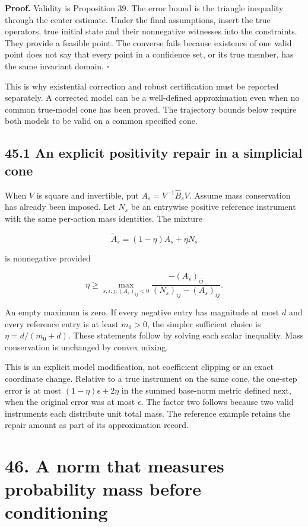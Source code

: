 \documentclass[11pt,letterpaper]{article}
\begin{document}
\textbf{Proof.} Validity is Proposition 39. The error bound is the
triangle inequality through the center estimate. Under the final
assumptions, insert the true operators, true initial state and their
nonnegative witnesses into the constraints. They provide a feasible
point. The converse fails because existence of one valid point does not
say that every point in a confidence set, or its true member, has the
same invariant domain. \(\square\)

This is why existential correction and robust certification must be
reported separately. A corrected model can be a well-defined
approximation even when no common true-model cone has been proved. The
trajectory bounds below require both models to be valid on a common
specified cone.

\subsection{45.1 An explicit positivity repair in a simplicial
cone}\label{an-explicit-positivity-repair-in-a-simplicial-cone}

When \(V\) is square and invertible, put \(A_s=V^{-1}\widehat B_sV\).
Assume mass conservation has already been imposed. Let \(N_s\) be an
entrywise positive reference instrument with the same per-action mass
identities. The mixture

\[
\widetilde A_s=(1-\eta)A_s+\eta N_s
\]

is nonnegative provided

\[
\eta\geq\max_{s,i,j:(A_s)_{ij}<0}
\frac{-(A_s)_{ij}}{(N_s)_{ij}-(A_s)_{ij}}.
\]

An empty maximum is zero. If every negative entry has magnitude at most
\(d\) and every reference entry is at least \(m_0>0\), the simpler
sufficient choice is \(\eta=d/(m_0+d)\). These statements follow by
solving each scalar inequality. Mass conservation is unchanged by convex
mixing.

This is an explicit model modification, not coefficient clipping or an
exact coordinate change. Relative to a true instrument on the same cone,
the one-step error is at most \((1-\eta)\epsilon+2\eta\) in the summed
base-norm metric defined next, when the original error was at most
\(\epsilon\). The factor two follows because two valid instruments each
distribute unit total mass. The reference example retains the repair
amount as part of its approximation record.

\section{46. A norm that measures probability mass before
conditioning}\label{a-norm-that-measures-probability-mass-before-conditioning}
\end{document}
